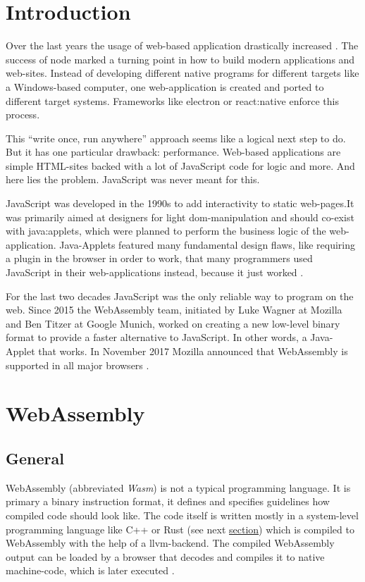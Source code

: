 
\section{Introduction}
Over the last years the usage of web-based application drastically increased \cite[cf.][]{stackoverflow:survey}. The success of \gls{node} marked a turning point in how to build modern applications and web-sites. Instead of developing different native programs for different targets like a Windows-based computer, one web-application is created and ported to different target systems. Frameworks like \gls{electron} or \gls{react:native} enforce this process.

This ``write once, run anywhere'' approach seems like a logical next step to do. But it has one particular drawback: performance. Web-based applications are simple HTML-sites backed with a lot of JavaScript code for logic and more. And here lies the problem. JavaScript was never meant for this.

JavaScript was developed in the 1990s to add interactivity to static web-pages.It was primarily aimed at designers for light \gls{dom}-manipulation and should co-exist with \glspl{java:applet}, which were planned to perform the business logic of the web-application. Java-Applets featured many fundamental design flaws, like requiring a plugin in the browser in order to work, that many programmers used JavaScript in their web-applications instead, because it just worked \cite{js:history, wasm:explanation, javaapplet:history}.

For the last two decades JavaScript was the only reliable way to program on the web. Since 2015 the WebAssembly team, initiated by Luke Wagner at Mozilla and Ben Titzer at Google Munich, worked on creating a new low-level binary format to provide a faster alternative to JavaScript. In other words, a Java-Applet that works. In November 2017 Mozilla announced that WebAssembly is supported in all major browsers \cite{wasm:revolution, wasm:support}.  

\section{WebAssembly}

\subsection{General}
WebAssembly (abbreviated \textit{Wasm}) is not a typical programming language. It is primary a binary instruction format, it defines and specifies guidelines how compiled code should look like. The code itself is written mostly in a system-level programming language like C++ or Rust (see next \hyperref[sec:rust]{section}) which is compiled to WebAssembly with the help of a \gls{llvm}-backend. The compiled WebAssembly output can be loaded by a browser that decodes and compiles it to native machine-code, which is later executed \cite{wasm:basics, wasm:howandwhy}.

